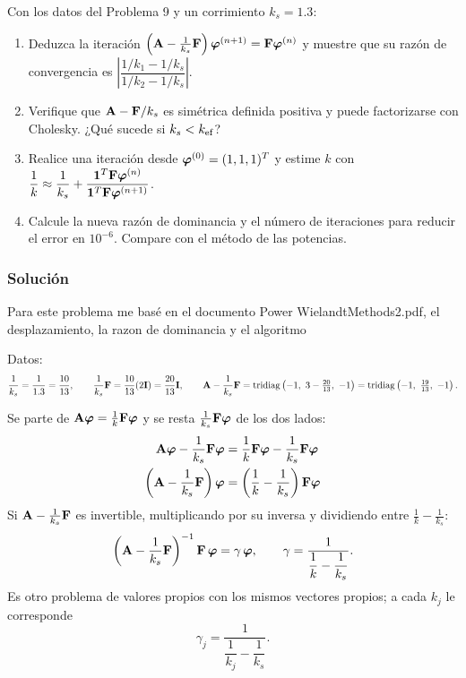 
\begin{enunciado}
	Con los datos del Problema 9 y un corrimiento $k_s = 1.3$:
	\begin{enumerate}[label=(\alph*)]
		\item Deduzca la iteración $\left(\mathbf{A} - \frac{1}{k_s}\mathbf{F}\right)\bm{\varphi}^{(n+1)} = \mathbf{F}\bm{\varphi}^{(n)}$
		y muestre que su razón de convergencia es $\left|\dfrac{1/k_1 - 1/k_s}{1/k_2 - 1/k_s}\right|$.
		\item Verifique que $\mathbf{A} - \mathbf{F}/k_s$ es simétrica definida positiva y puede factorizarse con
		Cholesky. ¿Qué sucede si $k_s < k_{\mathrm{ef}}$?
		\item Realice una iteración desde $\bm{\varphi}^{(0)} = (1, 1, 1)^T$ y estime $k$ con
		$\dfrac1k \approx \dfrac1{k_s} + \dfrac{\bm{1}^T\mathbf{F}\bm{\varphi}^{(n)}}{\bm{1}^T\mathbf{F}\bm{\varphi}^{(n+1)}}$.
		\item Calcule la nueva razón de dominancia y el número de iteraciones para reducir el error en
		$10^{-6}$. Compare con el método de las potencias.
	\end{enumerate}
\end{enunciado}

\subsubsection*{Solución}
Para este problema me basé en el documento Power WielandtMethods2.pdf, el desplazamiento, la razon de dominancia y el algoritmo

Datos:
\[
\frac{1}{k_s} = \frac{1}{1.3} = \frac{10}{13},\qquad
\frac{1}{k_s}\mat{F} = \frac{10}{13}(2\mat{I}) = \frac{20}{13}\mat{I},\qquad
\mat{A} - \frac{1}{k_s}\mat{F} = \tridiag\left(-1,\ 3 - \tfrac{20}{13},\ -1\right) = \tridiag\left(-1,\ \tfrac{19}{13},\ -1\right).
\]



Se parte de $\mathbf{A}\bm{\varphi} = \frac1k\mathbf{F}\bm{\varphi}$ y se resta $\frac{1}{k_s}\mathbf{F}\bm{\varphi}$ de los dos lados:
\begin{align*}
	\mathbf{A}\bm{\varphi} - \frac{1}{k_s}\mathbf{F}\bm{\varphi} &= \frac1k\mathbf{F}\bm{\varphi} - \frac{1}{k_s}\mathbf{F}\bm{\varphi}\\
	\left(\mathbf{A} - \frac{1}{k_s}\mathbf{F}\right)\bm{\varphi} &= \left(\frac1k - \frac{1}{k_s}\right)\mathbf{F}\bm{\varphi}
\end{align*}
Si $\mathbf{A} - \frac{1}{k_s}\mathbf{F}$ es invertible, multiplicando por su inversa y dividiendo entre $\frac1k - \frac1{k_s}$:
\[
\left(\mathbf{A} - \frac{1}{k_s}\mathbf{F}\right)^{-1}\mathbf{F}\,\bm{\varphi} = \gamma\,\bm{\varphi},
\qquad \gamma = \frac{1}{\dfrac1k - \dfrac{1}{k_s}} .
\]
Es otro problema de valores propios con los mismos vectores propios; a cada $k_j$ le corresponde
\[
\gamma_j = \frac{1}{\dfrac{1}{k_j} - \dfrac{1}{k_s}} .
\]

